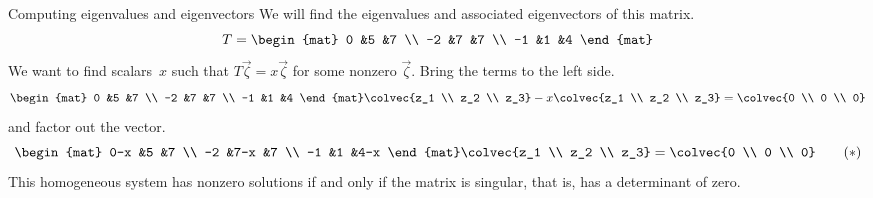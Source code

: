 \begin{frame}{Computing eigenvalues and eigenvectors}
\ex
We will find the eigenvalues and associated eigenvectors of this matrix.
\begin{equation*}
  T=
  \begin{mat}
    0 &5 &7 \\
   -2 &7 &7 \\
   -1 &1 &4
  \end{mat}
\end{equation*}
We want to find scalars~$x$ such that $T\vec{\zeta}=x\vec{\zeta}$ for 
some nonzero $\vec{\zeta}$.
Bring the terms to the left side.
\begin{equation*}
  \begin{mat}
    0 &5 &7 \\
   -2 &7 &7 \\
   -1 &1 &4
  \end{mat}
  \colvec{z_1 \\ z_2 \\ z_3}
  -x\colvec{z_1 \\ z_2 \\ z_3}
  =\colvec{0 \\ 0 \\ 0}
\end{equation*}
and factor out the vector.
\begin{equation*}
  \begin{mat}
    0-x &5   &7 \\
   -2   &7-x &7 \\
   -1   &1   &4-x
  \end{mat}
  \colvec{z_1 \\ z_2 \\ z_3}
  =
  \colvec{0 \\ 0 \\ 0}
  \tag{$*$}
\end{equation*}
This homogeneous system has nonzero solutions if and only if the 
matrix is singular, that is, has a determinant of zero.
\end{frame}
